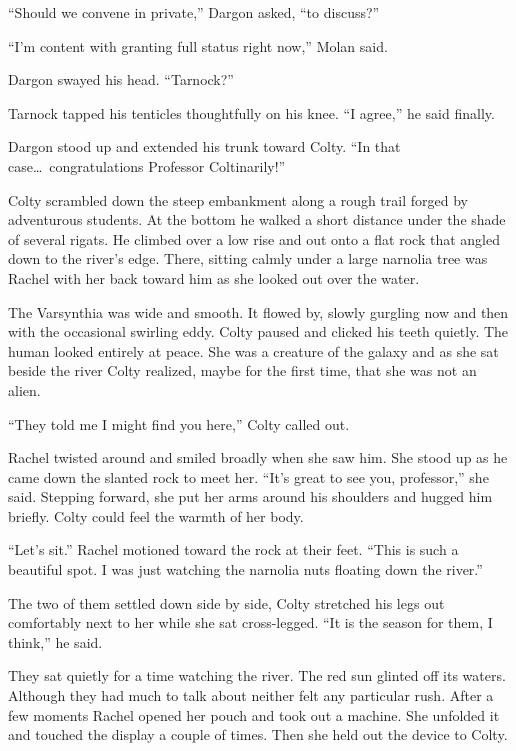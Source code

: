 ``Should we convene in private,'' Dargon asked, ``to discuss?''

``I'm content with granting full status right now,'' Molan said.

Dargon swayed his head. ``Tarnock?''

Tarnock tapped his tenticles thoughtfully on his knee. ``I agree,'' he said finally.

Dargon stood up and extended his trunk toward Colty. ``In that case\ldots\ congratulations
Professor Coltinarily!''

\spacebreak

Colty scrambled down the steep embankment along a rough trail forged by adventurous students. At
the bottom he walked a short distance under the shade of several rigats. He climbed over a low
rise and out onto a flat rock that angled down to the river's edge. There, sitting calmly under
a large narnolia tree was Rachel with her back toward him as she looked out over the water.

The Varsynthia was wide and smooth. It flowed by, slowly gurgling now and then with the
occasional swirling eddy. Colty paused and clicked his teeth quietly. The human looked entirely
at peace. She was a creature of the galaxy and as she sat beside the river Colty realized, maybe
for the first time, that she was not an alien.

``They told me I might find you here,'' Colty called out.

Rachel twisted around and smiled broadly when she saw him. She stood up as he came down the
slanted rock to meet her. ``It's great to see you, professor,'' she said. Stepping forward, she
put her arms around his shoulders and hugged him briefly. Colty could feel the warmth of her
body.

``Let's sit.'' Rachel motioned toward the rock at their feet. ``This is such a beautiful spot. I
was just watching the narnolia nuts floating down the river.''

The two of them settled down side by side, Colty stretched his legs out comfortably next to her
while she sat cross-legged. ``It is the season for them, I think,'' he said.

They sat quietly for a time watching the river. The red sun glinted off its waters. Although
they had much to talk about neither felt any particular rush. After a few moments Rachel opened
her pouch and took out a machine. She unfolded it and touched the display a couple of times.
Then she held out the device to Colty.

